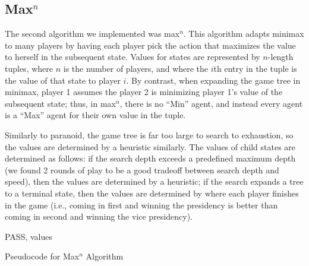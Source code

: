 \documentclass[11pt]{article}
\begin{document}
\subsection{Max$^n$}

The second algorithm we implemented was max$^n$. This algorithm adapts minimax to many players by having each player pick the action that maximizes the value to herself in the subsequent state. Values for states are represented by $n$-length tuples, where $n$ is the number of players, and where the $i$th entry in the tuple is the value of that state to player $i$. By contrast, when expanding the game tree in minimax, player 1 assumes the player 2 is minimizing player 1's value of the subsequent state; thus, in max$^n$, there is no ``Min'' agent, and instead every agent is a ``Max'' agent for their own value in the tuple.

Similarly to paranoid, the game tree is far too large to search to exhaustion, so the values are determined by a heuristic similarly. The values of child states are determined as follows: if the search depth exceeds a predefined maximum depth (we found 2 rounds of play to be a good tradeoff between search depth and speed), then the values are determined by a heuristic; if the search expands a tree to a terminal state, then the values are determined by where each player finishes in the game (i.e., coming in first and winning the presidency is better than coming in second and winning the vice presidency).

\begin{algorithm}
  \begin{algorithmic}
      \State \Return PASS, values
    \EndIf
	\EndIf
      \EndFor
    \EndIf
    \EndIf
    \EndFor
\EndProcedure
  \end{algorithmic}
  \caption{Pseudocode for Max$^n$ Algorithm}
\end{algorithm}
\end{document}
